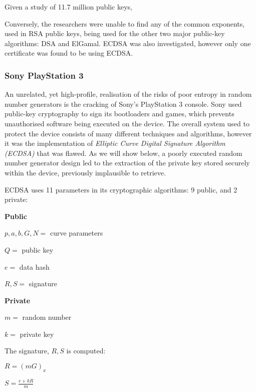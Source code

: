     Given a study of 11.7 million public keys, 
    
    Conversely, the researchers were unable to find any of the common exponents, used in RSA public keys, being used for the other two major public-key algorithms: DSA and ElGamal. ECDSA was also investigated, however only one certificate was found to be using ECDSA.
    
  \subsubsection{Sony PlayStation 3}
  
    An unrelated, yet high-profile, realisation of the risks of poor entropy in random number generators is the cracking of Sony's PlayStation 3 console. Sony used public-key cryptography to sign its bootloaders and games, which prevents unauthorised software being executed on the device. The overall system used to protect the device consists of many different techniques and algorithms, however it was the implementation of \emph{Elliptic Curve Digital Signature Algorithm (ECDSA)} that was flawed. As we will show below, a poorly executed random number generator design led to the extraction of the private key stored securely within the device, previously implausible to retrieve.
    
    ECDSA uses 11 parameters in its cryptographic algorithms: 9 public, and 2 private:
    
    \begin{center}
    \textbf{Public}
    
    $p, a, b, G, N =$  curve parameters
    
    $Q =$ public key
    
    $e =$ data hash
    
    $R, S =$ signature
    
    \textbf{Private}
    
    $m =$ random number
    
    $k =$ private key
    
    \end{center}
    
    The signature, $R, S$ is computed:
    
    \begin{center}
    
    $R = (mG)_x$
    
    $S = \frac{e+kR}{m}$
    
    \end{center}
    
